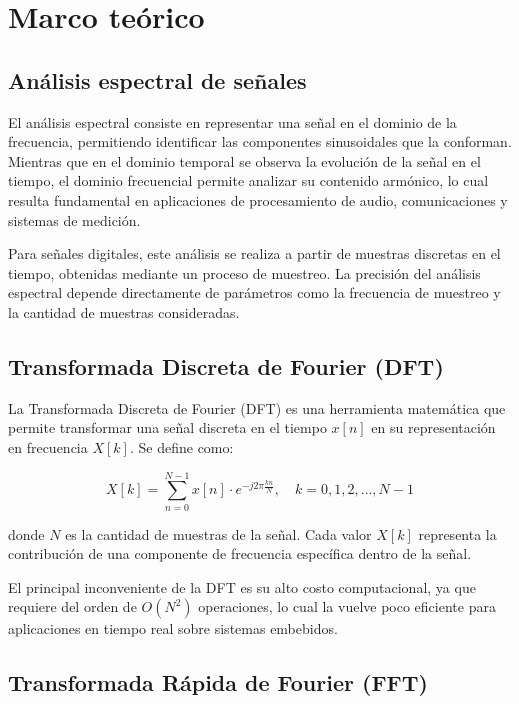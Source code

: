 \documentclass[12pt]{article}
\begin{document}
	\section{Marco teórico}

		\subsection{Análisis espectral de señales}

			El análisis espectral consiste en representar una señal en el dominio de la frecuencia, permitiendo identificar las componentes sinusoidales que la conforman. Mientras que en el dominio temporal se observa la evolución de la señal en el tiempo, el dominio frecuencial permite analizar su contenido armónico, lo cual resulta fundamental en aplicaciones de procesamiento de audio, comunicaciones y sistemas de medición.

			Para señales digitales, este análisis se realiza a partir de muestras discretas en el tiempo, obtenidas mediante un proceso de muestreo. La precisión del análisis espectral depende directamente de parámetros como la frecuencia de muestreo y la cantidad de muestras consideradas.

		\subsection{Transformada Discreta de Fourier (DFT)} 

			La Transformada Discreta de Fourier (DFT) es una herramienta matemática que permite transformar una señal discreta en el tiempo $x[n]$ en su representación en frecuencia $X[k]$. Se define como:

			\[
			X[k] = \sum_{n=0}^{N-1} x[n] \cdot e^{-j 2\pi \frac{k n}{N}}, \quad k = 0,1,2,\dots,N-1
			\]

			donde $N$ es la cantidad de muestras de la señal. Cada valor $X[k]$ representa la contribución de una componente de frecuencia específica dentro de la señal.

			El principal inconveniente de la DFT es su alto costo computacional, ya que requiere del orden de $O(N^2)$ operaciones, lo cual la vuelve poco eficiente para aplicaciones en tiempo real sobre sistemas embebidos.

		\subsection{Transformada Rápida de Fourier (FFT)}
\end{document}
